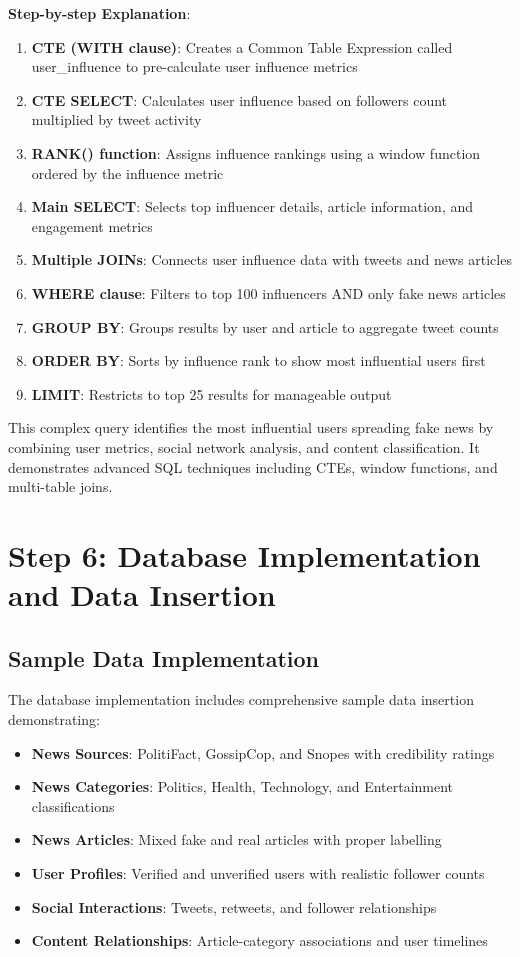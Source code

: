 \documentclass[12pt,a4paper]{report}
\begin{document}
\textbf{Step-by-step Explanation}:
\begin{enumerate}
    \item \textbf{CTE (WITH clause)}: Creates a Common Table Expression called user\_influence to pre-calculate user influence metrics
    \item \textbf{CTE SELECT}: Calculates user influence based on followers count multiplied by tweet activity
    \item \textbf{RANK() function}: Assigns influence rankings using a window function ordered by the influence metric
    \item \textbf{Main SELECT}: Selects top influencer details, article information, and engagement metrics
    \item \textbf{Multiple JOINs}: Connects user influence data with tweets and news articles
    \item \textbf{WHERE clause}: Filters to top 100 influencers AND only fake news articles
    \item \textbf{GROUP BY}: Groups results by user and article to aggregate tweet counts
    \item \textbf{ORDER BY}: Sorts by influence rank to show most influential users first
    \item \textbf{LIMIT}: Restricts to top 25 results for manageable output
\end{enumerate}
This complex query identifies the most influential users spreading fake news by combining user metrics, social network analysis, and content classification. It demonstrates advanced SQL techniques including CTEs, window functions, and multi-table joins.

\chapter{Step 6: Database Implementation and Data Insertion}

\section{Sample Data Implementation}

The database implementation includes comprehensive sample data insertion demonstrating:

\begin{itemize}
    \item \textbf{News Sources}: PolitiFact, GossipCop, and Snopes with credibility ratings
    \item \textbf{News Categories}: Politics, Health, Technology, and Entertainment classifications
    \item \textbf{News Articles}: Mixed fake and real articles with proper labelling
    \item \textbf{User Profiles}: Verified and unverified users with realistic follower counts
    \item \textbf{Social Interactions}: Tweets, retweets, and follower relationships
    \item \textbf{Content Relationships}: Article-category associations and user timelines
\end{itemize}
\end{document}
